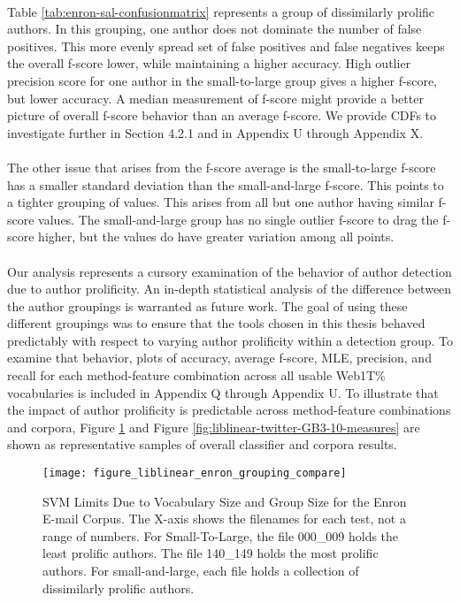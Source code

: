 	\paragraph*{} Table \ref{tab:enron-sal-confusionmatrix} represents a group of dissimilarly prolific authors.  In this grouping, one author does not dominate the number of false positives.  This more evenly spread set of false positives and false negatives keeps the overall f-score lower, while maintaining a higher accuracy.  High outlier precision score for one author in the small-to-large group gives a higher f-score, but lower accuracy.  A median measurement of f-score might provide a better picture of overall f-score behavior than an average f-score.  We provide CDFs to investigate further in Section 4.2.1 and in Appendix U through Appendix X.
	\paragraph*{} The other issue that arises from the f-score average is the small-to-large f-score has a smaller standard deviation than the small-and-large f-score.  This points to a tighter grouping of values.  This arises from all but one author having similar f-score values.  The small-and-large group has no single outlier f-score to drag the f-score higher, but the values do have greater variation among all points.
	\paragraph*{}Our analysis represents a cursory examination of the behavior of author detection due to author prolificity.  An in-depth statistical analysis of the difference between the author groupings is warranted as future work.  The goal of using these different groupings was to ensure that the tools chosen in this thesis behaved predictably with respect to varying author prolificity within a detection group.  To examine that behavior, plots of accuracy, average f-score, MLE, precision, and recall for each method-feature combination across all usable Web1T\% vocabularies is included in Appendix Q through Appendix U.  To illustrate that the impact of author prolificity is predictable across method-feature combinations and corpora, Figure \ref{fig:liblinear-enron-GB3-10-measures} and Figure \ref{fig:liblinear-twitter-GB3-10-measures} are shown as representative samples of overall classifier and corpora results.
	
\begin{figure}[htbp!]
	\begin{center}
	\centering
	\texttt{[image: figure\_liblinear\_enron\_grouping\_compare]}
	\caption{SVM Limits Due to Vocabulary Size and Group Size for the Enron E-mail Corpus.  The X-axis shows the filenames for each test, not a range of numbers.  For Small-To-Large, the file 000\_009 holds the least prolific authors.  The file 140\_149 holds the most prolific authors.  For small-and-large, each file holds a collection of dissimilarly prolific authors.}
	\label{fig:liblinear-enron-GB3-10-measures}
	\end{center}
\end{figure}

